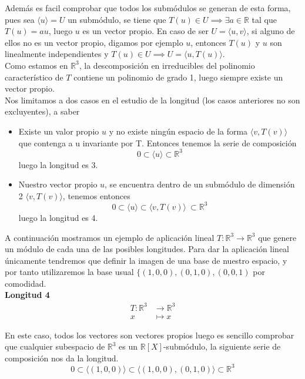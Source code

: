 Además es facil comprobar que todos los submódulos se generan de
esta forma, pues sea \(\langle u \rangle = U\) un submódulo, se tiene que \(T(u)
\in U \implies \exists a \in \mathbb{R}\) tal que \(T(u) = au\), luego \(u\) es un
vector propio. En caso de ser \(U = \langle u , v \rangle\), si alguno de ellos
no es un vector propio, digamos por ejemplo \(u\), entonces \(T(u)\) y \(u\) son linealmente independientes y
\(T(u) \in U \implies U = \langle u , T(u) \rangle\).\\

Como estamos en \(\mathbb{R}^3\), la descomposición en irreducibles del
polinomio característico de \(T\) contiene un polinomio de grado 1, luego
siempre existe un vector propio.\\

Nos limitamos a dos casos en el estudio de la longitud (los casos
anteriores no son excluyentes), a saber
\begin{itemize}
\item Existe un valor propio \(u\) y no existe ningún espacio de la forma
  \(\langle v, T(v)\rangle \) que contenga a u invariante por T. Entonces tenemos la serie de composición
  \[
    0 \subset \langle u \rangle \subset \mathbb{R}^3
  \]
  luego la longitud es 3.
\item Nuestro vector propio \(u\), se encuentra dentro de un submódulo de
  dimensión 2 \(\langle v, T(v) \rangle\), tenemos entonces
  \[
    0 \subset \langle u \rangle \subset \langle v, T(v) \rangle\ \subset \mathbb{R}^3
  \]
  luego la longitud es 4.
\end{itemize}

A continuación mostramos un ejemplo de aplicación lineal \(T:\mathbb{R}^3 \rightarrow \mathbb{R}^3\) que genere un módulo de cada una de las posibles longitudes.
Para dar la aplicación lineal únicamente tendremos que definir la imagen de una base de nuestro espacio, y por tanto utilizaremos la base usual
\(\{(1,0,0), (0,1,0), (0,0,1)\) por comodidad.\\

\textbf{Longitud 4}%
\[
\begin{aligned}
  T:\mathbb{R}^3 &\rightarrow \mathbb{R}^3\\
  x &\mapsto x
\end{aligned}
\]

En este caso, todos los vectores son vectores propios luego es sencillo comprobar que cualquier subespacio de \(\mathbb{R}^3\) es un
\(\mathbb{R}[X]\)-submódulo, la siguiente serie de composición nos da la longitud.
\[
        0 \subset \langle (1,0,0) \rangle \subset \langle (1,0,0), (0,1,0)
        \rangle \subset \mathbb{R}^3
\]

